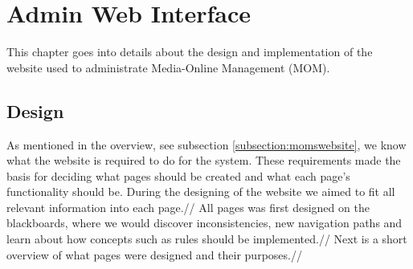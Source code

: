 \chapter{Admin Web Interface}
This chapter goes into details about the design and implementation of the website used to administrate Media-Online Management (MOM).

\section{Design}
As mentioned in the overview, see subsection \vref{subsection:momswebsite}, we know what the website is required to do for the system.
These requirements made the basis for deciding what pages should be created and what each page's functionality should be. During the designing of the website we aimed to fit all relevant information into each page.//
All pages was first designed on the blackboards, where we would discover inconsistencies, new navigation paths and learn about how concepts such as rules should be implemented.//
Next is a short overview of what pages were designed and their purposes.//

